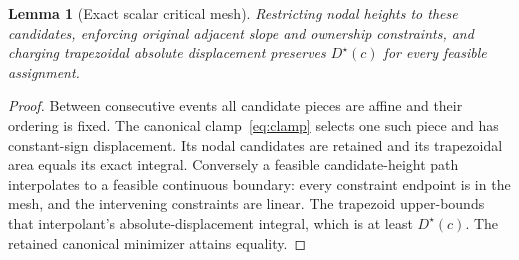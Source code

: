 \documentclass[10pt,letterpaper]{article}
\newtheorem{lemma}[theorem]{Lemma}
\begin{document}
\begin{lemma}[Exact scalar critical mesh]\label{lem:mesh}
Restricting nodal heights to these candidates, enforcing original adjacent slope and ownership constraints, and charging trapezoidal absolute displacement preserves $D^\star(c)$ for every feasible assignment.
\end{lemma}
\begin{proof}
Between consecutive events all candidate pieces are affine and their ordering is fixed. The canonical clamp~\eqref{eq:clamp} selects one such piece and has constant-sign displacement. Its nodal candidates are retained and its trapezoidal area equals its exact integral. Conversely a feasible candidate-height path interpolates to a feasible continuous boundary: every constraint endpoint is in the mesh, and the intervening constraints are linear. The trapezoid upper-bounds that interpolant's absolute-displacement integral, which is at least $D^\star(c)$. The retained canonical minimizer attains equality.
\end{proof}
\end{document}
